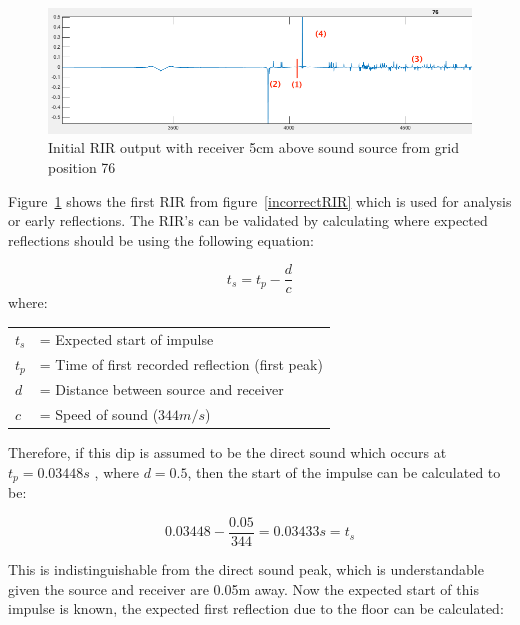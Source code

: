 \documentclass[../../main.tex]{subfiles}
\begin{document}
			\begin{figure}[H]
				\center\includegraphics[scale = 0.5]{Sections/Implementation/Odeon/images/incorrectRIR/RIR_76_incorrect_edit_crop.png}
				\caption{Initial \ac{RIR} output with receiver 5cm above sound source from grid position 76}
				\label{incorrectRIR_76}
			\end{figure}

			Figure~\ref{incorrectRIR_76} shows the first \ac{RIR} from figure~\ref{incorrectRIR} which is used for analysis or early reflections. The \ac{RIR}'s can be validated by calculating where expected reflections should be using the following equation:
			
			\begin{equation}\label{distance}
				t_s = t_p - \frac{d}{c}
			\end{equation}
			where:

			\begin{tabular}{l l}
			$t_s$ & = Expected start of impulse \\
			$t_p$ & = Time of first recorded reflection (first peak) \\
			$d$ & = Distance between source and receiver\\
			$c$ & = Speed of sound ($344m/s$) \\
			\end{tabular}


			Therefore, if this dip is assumed to be the direct sound which occurs at $t_p = 0.03448s$ , where $d = 0.5$, then the start of the impulse can be calculated to be:

			\begin{equation}
			 0.03448 - \frac{0.05}{344} = 0.03433s = t_s
			\end{equation}

			This is indistinguishable from the direct sound peak, which is understandable given the source and receiver are 0.05m away. Now the expected start of this impulse is known, the expected first reflection due to the floor can be calculated:
\end{document}
